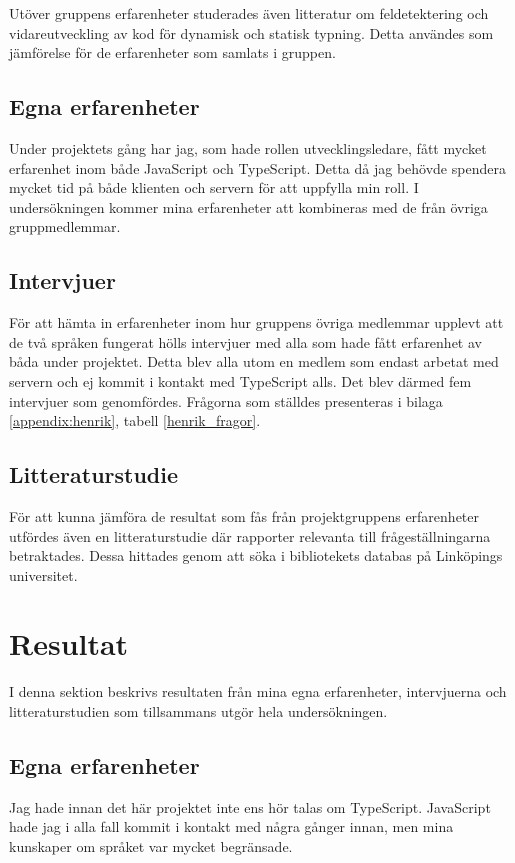 Utöver gruppens erfarenheter studerades även litteratur om feldetektering och vidareutveckling av kod för dynamisk och statisk typning. Detta användes som jämförelse för de erfarenheter som samlats i gruppen.

\subsection{Egna erfarenheter}
Under projektets gång har jag, som hade rollen utvecklingsledare, fått mycket erfarenhet inom både JavaScript och TypeScript. Detta då jag behövde spendera mycket tid på både klienten och servern för att uppfylla min roll. I undersökningen kommer mina erfarenheter att kombineras med de från övriga gruppmedlemmar.

\subsection{Intervjuer}
För att hämta in erfarenheter inom hur gruppens övriga medlemmar upplevt att de två språken fungerat hölls intervjuer med alla som hade fått erfarenhet av båda under projektet. Detta blev alla utom en medlem som endast arbetat med servern och ej kommit i kontakt med TypeScript alls. Det blev därmed fem intervjuer som genomfördes. Frågorna som ställdes presenteras i bilaga \ref{appendix:henrik}, tabell \ref{henrik_fragor}.

\subsection{Litteraturstudie}
För att kunna jämföra de resultat som fås från projektgruppens erfarenheter utfördes även en litteraturstudie där rapporter relevanta till frågeställningarna betraktades. Dessa hittades genom att söka i bibliotekets databas på Linköpings universitet.

\section{Resultat}
I denna sektion beskrivs resultaten från mina egna erfarenheter, intervjuerna och litteraturstudien som tillsammans utgör hela undersökningen.
\subsection{Egna erfarenheter}
Jag hade innan det här projektet inte ens hör talas om TypeScript. JavaScript hade jag i alla fall kommit i kontakt med några gånger innan, men mina kunskaper om språket var mycket begränsade.

